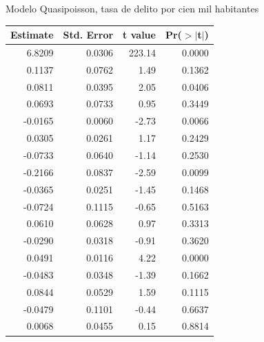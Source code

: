 \documentclass[ignorenonframetext,]{beamer}
\begin{document}
\begin{frame}{Modelo Quasipoisson, tasa de delito por cien mil
habitantes}

\begin{table}[ht]
\centering
{\tiny
\begin{tabular}{rrrr}
  \hline
Estimate & Std. Error & t value & Pr($>$$|$t$|$) \\ 
  \hline
6.8209 & 0.0306 & 223.14 & 0.0000 \\ 
  0.1137 & 0.0762 & 1.49 & 0.1362 \\ 
  0.0811 & 0.0395 & 2.05 & 0.0406 \\ 
  0.0693 & 0.0733 & 0.95 & 0.3449 \\ 
  -0.0165 & 0.0060 & -2.73 & 0.0066 \\ 
  0.0305 & 0.0261 & 1.17 & 0.2429 \\ 
  -0.0733 & 0.0640 & -1.14 & 0.2530 \\ 
  -0.2166 & 0.0837 & -2.59 & 0.0099 \\ 
  -0.0365 & 0.0251 & -1.45 & 0.1468 \\ 
  -0.0724 & 0.1115 & -0.65 & 0.5163 \\ 
  0.0610 & 0.0628 & 0.97 & 0.3313 \\ 
  -0.0290 & 0.0318 & -0.91 & 0.3620 \\ 
  0.0491 & 0.0116 & 4.22 & 0.0000 \\ 
  -0.0483 & 0.0348 & -1.39 & 0.1662 \\ 
  0.0844 & 0.0529 & 1.59 & 0.1115 \\ 
  -0.0479 & 0.1101 & -0.44 & 0.6637 \\ 
  0.0068 & 0.0455 & 0.15 & 0.8814 \\ 
   \hline
\end{tabular}
}
\end{table}

\end{frame}
\end{document}
